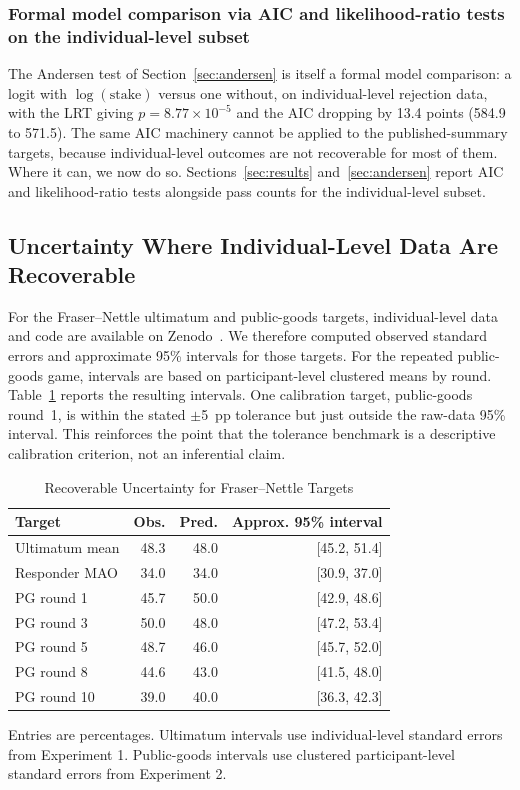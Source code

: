 \documentclass[journal]{IEEEtran}
\begin{document}
\subsubsection{Formal model comparison via AIC and likelihood-ratio tests on the individual-level subset}
The Andersen test of Section~\ref{sec:andersen} is itself a formal model comparison: a logit with $\log(\text{stake})$ versus one without, on individual-level rejection data, with the LRT giving $p=8.77\times10^{-5}$ and the AIC dropping by 13.4 points (584.9 to 571.5).
The same AIC machinery cannot be applied to the published-summary targets, because individual-level outcomes are not recoverable for most of them.
Where it can, we now do so.
Sections~\ref{sec:results} and~\ref{sec:andersen} report AIC and likelihood-ratio tests alongside pass counts for the individual-level subset.

\subsection{Uncertainty Where Individual-Level Data Are Recoverable}

For the Fraser--Nettle ultimatum and public-goods targets, individual-level data and code are available on Zenodo~\cite{fraserdata2020}.
We therefore computed observed standard errors and approximate 95\% intervals for those targets.
For the repeated public-goods game, intervals are based on participant-level clustered means by round.
Table~\ref{tab:ci_recoverable} reports the resulting intervals.
One calibration target, public-goods round~1, is within the stated $\pm$5~pp tolerance but just outside the raw-data 95\% interval.
This reinforces the point that the tolerance benchmark is a descriptive calibration criterion, not an inferential claim.

\begin{table}[!t]
\renewcommand{\arraystretch}{1.1}
\caption{Recoverable Uncertainty for Fraser--Nettle Targets}
\label{tab:ci_recoverable}
\centering
\begin{tabular}{l r r r}
\toprule
\textbf{Target} & \textbf{Obs.} & \textbf{Pred.} & \textbf{Approx. 95\% interval} \\
\midrule
Ultimatum mean & 48.3 & 48.0 & [45.2, 51.4] \\
Responder MAO & 34.0 & 34.0 & [30.9, 37.0] \\
PG round 1 & 45.7 & 50.0 & [42.9, 48.6] \\
PG round 3 & 50.0 & 48.0 & [47.2, 53.4] \\
PG round 5 & 48.7 & 46.0 & [45.7, 52.0] \\
PG round 8 & 44.6 & 43.0 & [41.5, 48.0] \\
PG round 10 & 39.0 & 40.0 & [36.3, 42.3] \\
\bottomrule
\end{tabular}
\begin{flushleft}
\footnotesize{Entries are percentages. Ultimatum intervals use individual-level standard errors from Experiment 1. Public-goods intervals use clustered participant-level standard errors from Experiment 2.}
\end{flushleft}
\end{table}
\end{document}
